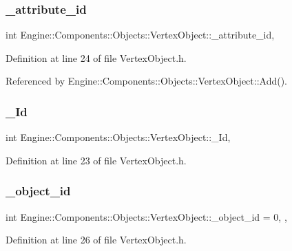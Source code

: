\subsubsection{\texorpdfstring{\+\_\+attribute\+\_\+id}{\_attribute\_id}}
{\footnotesize\ttfamily int Engine\+::\+Components\+::\+Objects\+::\+Vertex\+Object\+::\+\_\+attribute\+\_\+id\hspace{0.3cm}{\ttfamily [protected]}, {\ttfamily [inherited]}}



Definition at line 24 of file Vertex\+Object.\+h.



Referenced by Engine\+::\+Components\+::\+Objects\+::\+Vertex\+Object\+::\+Add().

\mbox{\label{classEngine_1_1Components_1_1Objects_1_1VertexObject_aa76ac755e9e37853a778795f0a0ad15e}} 
\subsubsection{\texorpdfstring{\+\_\+\+Id}{\_Id}}
{\footnotesize\ttfamily int Engine\+::\+Components\+::\+Objects\+::\+Vertex\+Object\+::\+\_\+\+Id\hspace{0.3cm}{\ttfamily [protected]}, {\ttfamily [inherited]}}



Definition at line 23 of file Vertex\+Object.\+h.

\mbox{\label{classEngine_1_1Components_1_1Objects_1_1VertexObject_aef076731df98a4806c644a3ac4400ae2}} 
\subsubsection{\texorpdfstring{\+\_\+object\+\_\+id}{\_object\_id}}
{\footnotesize\ttfamily int Engine\+::\+Components\+::\+Objects\+::\+Vertex\+Object\+::\+\_\+object\+\_\+id = 0\hspace{0.3cm}{\ttfamily [static]}, {\ttfamily [protected]}, {\ttfamily [inherited]}}



Definition at line 26 of file Vertex\+Object.\+h.

